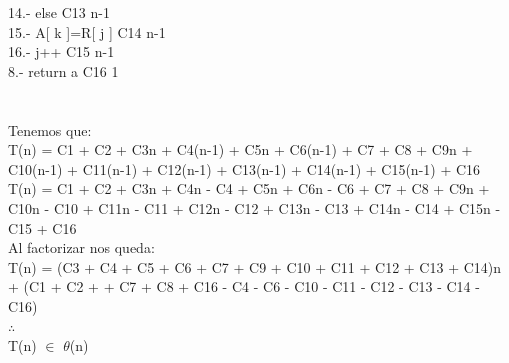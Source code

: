 \documentclass[spanish]{article}
\begin{document}
	14.- \hspace{0.5cm}else  \hspace{5.5cm} C13 \hspace{4.8cm} n-1\\
	15.-\hspace{1cm} A[ k ]=R[ j ] \hspace{3.3cm} C14 \hspace{4.8cm} n-1\\
	16.- \hspace{1cm} j++ \hspace{4.6cm} C15 \hspace{4.8cm} n-1\\
	8.- return a\hspace{5.5cm} C16 \hspace{4.8cm} 1 \\\\

    \\
	Tenemos que:\\
	T(n) = C1 + C2 + C3n + C4(n-1) + C5n + C6(n-1) + C7 + C8 + C9n + C10(n-1) + C11(n-1) + C12(n-1) + C13(n-1) + C14(n-1) + C15(n-1) + C16\\
	T(n) = C1 + C2 + C3n + C4n - C4 + C5n + C6n - C6 + C7 + C8 + C9n + C10n - C10 + C11n - C11 + C12n - C12 + C13n - C13 + C14n - C14 + C15n - C15 + C16\\
	Al factorizar nos queda:\\
	T(n) = (C3 + C4 + C5 + C6 + C7 + C9 + C10 + C11 + C12 + C13 + C14)n + (C1 + C2 + + C7 + C8 + C16 - C4 - C6 - C10 - C11 - C12 - C13 - C14 - C16)\\
	$\therefore$\\
	T(n) $\in$ $\theta$(n)\\
	
\end{document}
